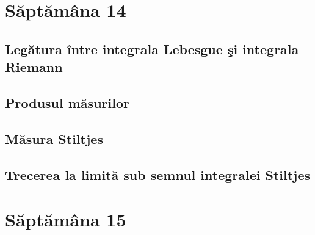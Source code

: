 \documentclass[a4paper,12pt]{article}
\theoremstyle{change}
\begin{document}
\section{Săptămâna 14}


\subsection{Legătura între integrala Lebesgue şi integrala Riemann}


\subsection{Produsul măsurilor}


\subsection{Măsura Stiltjes}


\subsection{Trecerea la limită sub semnul integralei Stiltjes}

\section{Săptămâna 15}
\end{document}
